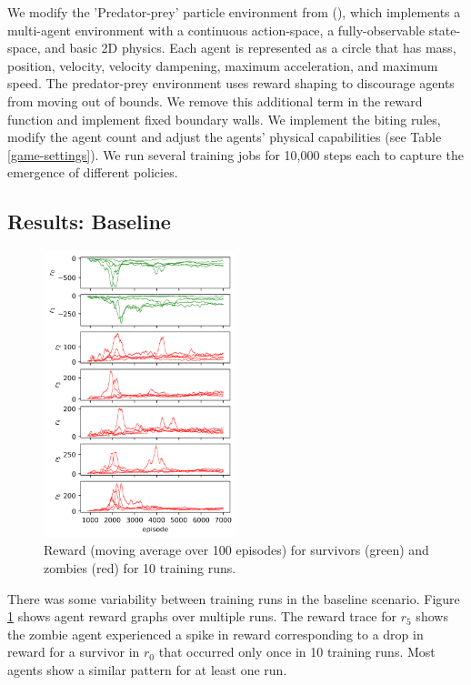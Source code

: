 \documentclass[11pt,a4paper]{article}
\begin{document}
We modify the 'Predator-prey' particle environment from (), which implements a multi-agent environment with a continuous action-space, a fully-observable state-space, and basic 2D physics.
Each agent is represented as a circle that has mass, position, velocity, velocity dampening, maximum acceleration, and maximum speed.
The predator-prey environment uses reward shaping to discourage agents from moving out of bounds.
We remove this additional term in the reward function and implement fixed boundary walls.
We implement the biting rules, modify the agent count and adjust the agents' physical capabilities (see Table \ref{game-settings}).
We run several training jobs for 10,000 steps each to capture the emergence of different policies.

\subsection{Results: Baseline}

\begin{figure}
  \centering
  \includegraphics[width=0.5\textwidth]{figures/baseline_reward.png}
  \caption{Reward (moving average over 100 episodes) for survivors (green) and zombies (red) for 10 training runs.}
  \label{fig:baseline_reward}
\end{figure}

There was some variability between training runs in the baseline scenario.
Figure \ref{fig:baseline_reward} shows agent reward graphs over multiple runs.
The reward trace for $r_5$ shows the zombie agent experienced a spike in reward corresponding to a drop in reward for a survivor in $r_0$
that occurred only once in 10 training runs.
Most agents show a similar pattern for at least one run.
\end{document}
